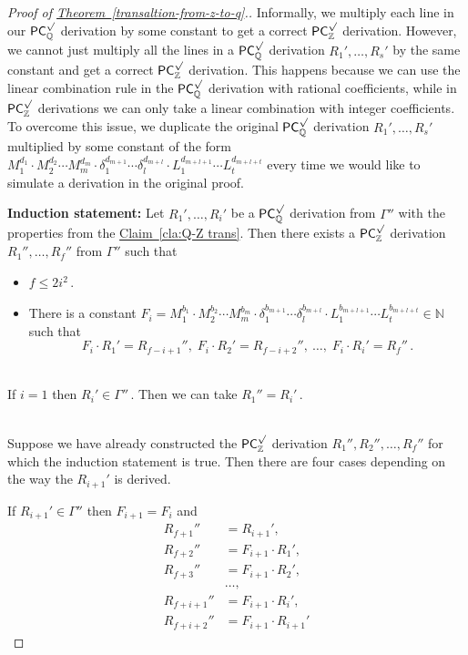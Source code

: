 \documentclass[11pt]{article}
\newcommand{\expref}[2]{\texorpdfstring{\hyperref[#2]{#1~\ref{#2}}}{#1~\ref{#2}}}
\newcommand{\Q}{{\mathbb Q}}
\newcommand{\Z}{{\mathbb Z}}
\begin{document}
\begin{proof}[Proof of \expref{Theorem}{transaltion-from-z-to-q}.]
Informally, we multiply each line in our  $\mathsf{PC}_{\Q}^{\surd}$ derivation by some constant to get a correct $\mathsf{PC}_{\Z}^{\surd}$ derivation. However, we cannot just multiply all the lines in a $\mathsf{PC}_{\Q}^{\surd}$ derivation %
$R_1', \ldots, R_s'$ %
 by the same constant and get a correct  $\mathsf{PC}_{\Z}^{\surd}$ derivation. This happens because we can use the linear combination rule in the  $\mathsf{PC}_{\Q}^{\surd}$ derivation with rational coefficients, while in   $\mathsf{PC}_{\Z}^{\surd}$ derivations we can only take a linear combination with integer coefficients. To overcome this issue, we duplicate the original $\mathsf{PC}_{\Q}^{\surd}$ derivation %
$R_1', \ldots, R_s'$ %
  multiplied by some constant of the form $M_1^{d_1} \cdot M_2^{d_2} \cdots M_m^{d_m} \cdot \delta_1^{d_{m + 1}} \cdots \delta_l^{d_{m + l}} \cdot  L_1^{d_{m + l + 1}} \cdots L_t^{d_{m + l + t}}$  every time we would like to simulate a derivation in the original proof.
%

\noindent\textbf{Induction statement:} Let %
$R_1', \ldots, R_i'$ %
 be a $\mathsf{PC}_{\Q}^{\surd}$ derivation from $\Gamma''$ with the properties from the \expref{Claim}{cla:Q-Z trans}. Then there exists a $\mathsf{PC}_{\Z}^{\surd}$ derivation %
$R_1'', \ldots, R_f''$ %
 from $\Gamma''$ such that
\begin{itemize}
    \item %
$f \le 2 i^2\,.$ %
    \item There is a constant $F_i = M_1^{b_1} \cdot M_2^{b_2} \cdots M_m^{b_m} \cdot \delta_1^{b_{m + 1}} \cdots \delta_l^{b_{m + l}} \cdot  L_1^{b_{m + l + 1}} \cdots L_t^{b_{m + l + t}} \in \mathbb{N}$ such that %
    $$
    F_i \cdot R_1' = R_{f - i + 1}'', \; F_i \cdot R_2' = R_{f - i + 2}'', \: \ldots, \;  F_i \cdot R_i' = R_{f}''\,. %
    $$
\end{itemize}


\mbox{}\\  If $i = 1$ then %
$R_i' \in \Gamma''\,.$ %
 Then we can take %
$R_{1}'' = R_i'\,.$ %

\mbox{}\\  Suppose we have already constructed the $\mathsf{PC}_{\Z}^{\surd}$ derivation %
$R_1'', R_2'', \ldots, R_{f}''$ %
 for which the induction statement is true. Then there are four cases depending on the way the $R_{i + 1}'$ is derived.

 If $R_{i + 1}' \in \Gamma''$ then $F_{i + 1} = F_i$ and
\begin{align*}
R_{f + 1}'' &= R_{i + 1}', \\ R_{f + 2}'' &= F_{i + 1} \cdot R_1', \\ R_{f + 3}'' &= F_{i + 1} \cdot R_2', \\ &\ldots, \\  R_{f + i + 1}'' &= F_{i + 1} \cdot R_i', \\ R_{f + i + 2}'' &= F_{i + 1} \cdot R_{i + 1}'  
\end{align*}


\end{proof}
\end{document}
